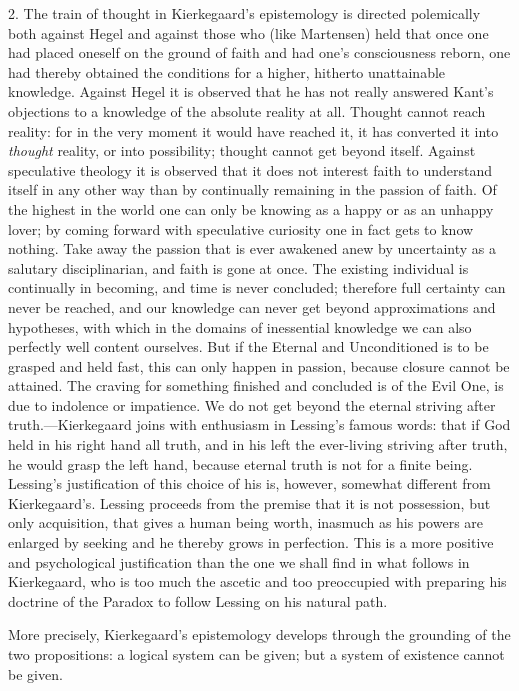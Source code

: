 \documentclass[12pt,a4paper]{book}
\newcommand{\opage}[1]{\marginnote{\footnotesize\textit{[#1]}}}
\begin{document}
2. The train of thought in Kierkegaard's epistemology is directed
polemically both against Hegel and against those who (like Martensen)
held that once one had placed oneself on the ground of faith and had
one's consciousness reborn, one had thereby obtained the conditions for a
higher, hitherto unattainable knowledge. Against Hegel it is observed
that he has not really answered Kant's objections to a knowledge of the
absolute reality at all. Thought cannot reach reality: for in the very
moment it would have reached it, it has converted it into \textit{thought}
reality, or into possibility; thought cannot get beyond itself. Against
speculative theology it is observed that it does not interest faith to
understand itself in any other way than by continually remaining in the
passion of faith. Of the highest in the world one can only be knowing as
a happy or as an unhappy lover; by coming forward with speculative
curiosity one in fact gets to know nothing. Take away the passion that is
ever awakened anew by uncertainty as a salutary disciplinarian, and faith
is gone at once. The existing individual is continually in becoming, and
time is never
\opage{60}concluded; therefore full certainty can never be reached, and our
knowledge can never get beyond approximations and hypotheses, with which
in the domains of inessential knowledge we can also perfectly well
content ourselves. But if the Eternal and Unconditioned is to be grasped
and held fast, this can only happen in passion, because closure cannot be
attained. The craving for something finished and concluded is of the
Evil One, is due to indolence or impatience. We do not get beyond the
eternal striving after truth.---Kierkegaard joins with enthusiasm in
Lessing's famous words: that if God held in his right hand all truth,
and in his left the ever-living striving after truth, he would grasp the
left hand, because eternal truth is not for a finite being. Lessing's
justification of this choice of his is, however, somewhat different from
Kierkegaard's. Lessing proceeds from the premise that it is not
possession, but only acquisition, that gives a human being worth,
inasmuch as his powers are enlarged by seeking and he thereby grows in
perfection. This is a more positive and psychological justification than
the one we shall find in what follows in Kierkegaard, who is too much the
ascetic and too preoccupied with preparing his doctrine of the Paradox to
follow Lessing on his natural path.

More precisely, Kierkegaard's epistemology develops through the grounding
of the two propositions: a logical system can be given; but a system of
existence cannot be given.
\end{document}
